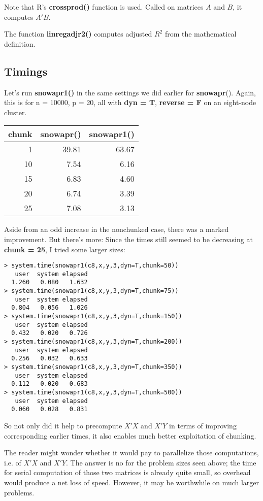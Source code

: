 Note that R's {\bf crossprod()} function is used.  Called on matrices
$A$ and $B$, it computes $A'B$.

The function {\bf linregadjr2()} computes adjusted $R^2$ from the
mathematical definition.

\subsection{Timings}

Let's run {\bf snowapr1()} in the same settings we did earlier for {\bf
snowapr}().  Again, this is for n = 10000, p = 20, all with {\bf dyn =
T}, {\bf reverse = F} on an eight-node cluster.

\begin{tabular}{|r|r|r|}
\hline
{\bf chunk} & {\bf snowapr()} & {\bf snowapr1()} \\ \hline 
1 & 39.81 & 63.67 \\ \hline 
10 & 7.54 & 6.16 \\ \hline 
15 & 6.83 & 4.60 \\ \hline 
20 & 6.74 & 3.39 \\ \hline 
25 & 7.08 & 3.13 \\ \hline 
\end{tabular}

Aside from an odd increase in the nonchunked case, there was a marked
improvement.  But there's more:  Since the times still seemed to be
decreasing at {\bf chunk = 25}, I tried some larger sizes:

\begin{Verbatim}[fontsize=\relsize{-2}]
> system.time(snowapr1(c8,x,y,3,dyn=T,chunk=50))
   user  system elapsed
  1.260   0.080   1.632
> system.time(snowapr1(c8,x,y,3,dyn=T,chunk=75))
   user  system elapsed
  0.804   0.056   1.026
> system.time(snowapr1(c8,x,y,3,dyn=T,chunk=150))
   user  system elapsed
  0.432   0.020   0.726
> system.time(snowapr1(c8,x,y,3,dyn=T,chunk=200))
   user  system elapsed
  0.256   0.032   0.633
> system.time(snowapr1(c8,x,y,3,dyn=T,chunk=350))
   user  system elapsed
  0.112   0.020   0.683
> system.time(snowapr1(c8,x,y,3,dyn=T,chunk=500))
   user  system elapsed
  0.060   0.028   0.831
\end{Verbatim}

So not only did it help to precompute $X'X$ and $X'Y$ in terms of
improving corresponding earlier times, it also enables much better
exploitation of chunking.

The reader might wonder whether it would pay to parallelize those
computations, i.e. of  $X'X$ and $X'Y$.  The answer is no for the
problem sizes seen above; the time for serial computation of those two
matrices is already quite small, so overhead would produce a net loss of
speed.  However, it may be worthwhile on much larger problems.

